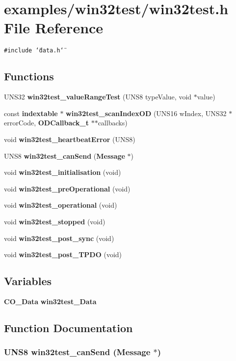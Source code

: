\section{examples/win32test/win32test.h File Reference}
\label{win32test_8h}
{\tt \#include \char`\"{}data.h\char`\"{}}\par
\subsection*{Functions}
\begin{CompactItemize}
\item 
UNS32 {\bf win32test\_\-value\-Range\-Test} (UNS8 type\-Value, void $\ast$value)
\item 
const {\bf indextable} $\ast$ {\bf win32test\_\-scan\-Index\-OD} (UNS16 w\-Index, UNS32 $\ast$error\-Code, {\bf ODCallback\_\-t} $\ast$$\ast$callbacks)
\item 
void {\bf win32test\_\-heartbeat\-Error} (UNS8)
\item 
UNS8 {\bf win32test\_\-can\-Send} ({\bf Message} $\ast$)
\item 
void {\bf win32test\_\-initialisation} (void)
\item 
void {\bf win32test\_\-pre\-Operational} (void)
\item 
void {\bf win32test\_\-operational} (void)
\item 
void {\bf win32test\_\-stopped} (void)
\item 
void {\bf win32test\_\-post\_\-sync} (void)
\item 
void {\bf win32test\_\-post\_\-TPDO} (void)
\end{CompactItemize}
\subsection*{Variables}
\begin{CompactItemize}
\item 
{\bf CO\_\-Data} {\bf win32test\_\-Data}
\end{CompactItemize}


\subsection{Function Documentation}
\subsubsection{\setlength{\rightskip}{0pt plus 5cm}UNS8 win32test\_\-can\-Send ({\bf Message} $\ast$)}\label{win32test_8h_0bd08b5678321e6b944e23311ff2a676}


